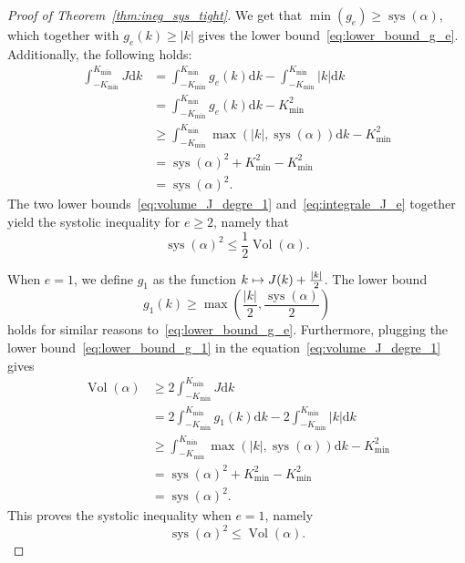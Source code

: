 \documentclass[AHL,Unicode,longabstracts]{cedram}
\DeclareMathOperator{\vol}{Vol}
\DeclareMathOperator{\sys}{sys}
\newcommand{\rmd}{\mathrm{d}}
\let\oldmapsto\mapsto
\renewcommand*{\mapsto}{\mathchoice{\longmapsto}{\oldmapsto}{\oldmapsto}{\oldmapsto}}
\begin{document}
\begin{proof}[{Proof of Theorem~\ref{thm:ineg_sys_tight}}]
We get that $\min(g_e) \geq \sys(\alpha)$, which together with $g_e(k) \geq |k|$ gives the lower bound~\eqref{eq:lower_bound_g_e}. Additionally, the following holds:
\begin{equation}\label{eq:integrale_J_e}
\begin{split}
\int_{-K_{\min}}^{K_{\min}} J \rmd k &= \int_{-K_{\min}}^{K_{\min}} g_e(k) \rmd k - \int_{-K_{\min}}^{K_{\min}}|k| \rmd k \\
&= \int_{-K_{\min}}^{K_{\min}} g_e(k) \rmd k - K_{\min}^2 \\
&\geq \int_{-K_{\min}}^{K_{\min}} \max\left(|k|, \sys(\alpha)\right) \rmd k - K_{\min}^2 \\
&= \sys(\alpha)^2 + K_{\min}^2 - K_{\min}^2 \\
&= \sys(\alpha)^2.
\end{split}
\end{equation}
The two lower bounds~\eqref{eq:volume_J_degre_1} and~\eqref{eq:integrale_J_e} together yield the systolic inequality for $e\geq 2$, namely that
\begin{equation}\label{eq:ineg_sys_e_2}
\sys(\alpha)^2 \leq \frac{1}{2} \vol(\alpha).
\end{equation}

When $e=1$, we define $g_1$ as the function $k \mapsto J(k) + \frac{|k|}{2}$. The lower bound
\begin{equation}\label{eq:lower_bound_g_1}
g_1(k) \geq \max\left(\frac{|k|}{2}, \frac{\sys(\alpha)}{2}\right)
\end{equation}
holds for similar reasons to~\eqref{eq:lower_bound_g_e}. Furthermore, plugging the lower bound~\eqref{eq:lower_bound_g_1} in the equation~\eqref{eq:volume_J_degre_1} gives
\begin{equation}
\begin{split}\label{eq:integrale_J_1}
\vol(\alpha) &\geq 2 \int_{-K_{\min}}^{K_{\min}} J \rmd k \\
&= 2\int_{-K_{\min}}^{K_{\min}} g_1(k) \rmd k - 2\int_{-K_{\min}}^{K_{\min}}|k| \rmd k \\
&\geq \int_{-K_{\min}}^{K_{\min}} \max\left(|k|, \sys(\alpha)\right) \rmd k - K_{\min}^2 \\
&= \sys(\alpha)^2 + K_{\min}^2 - K_{\min}^2 \\
&= \sys(\alpha)^2.
\end{split}
\end{equation}
This proves the systolic inequality when $e=1$, namely
\begin{equation}\label{eq:ineg_sys_e_1}
\sys(\alpha)^2 \leq \vol(\alpha).
\end{equation}


\end{proof}
\end{document}
